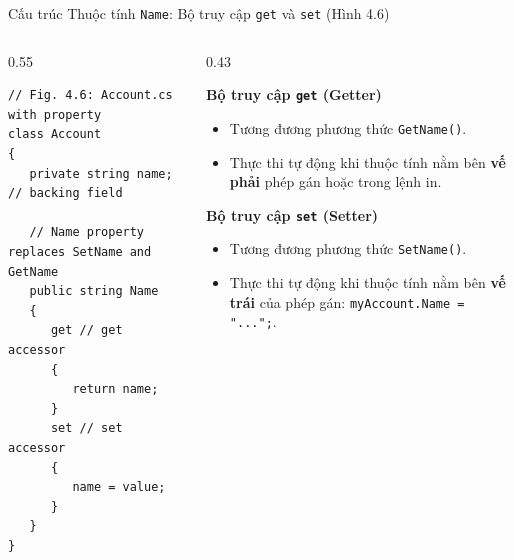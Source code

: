 \documentclass[aspectratio=169, 10pt]{beamer}
\begin{document}
\begin{frame}[fragile]{Cấu trúc Thuộc tính \texttt{Name}: Bộ truy cập \texttt{get} và \texttt{set} (Hình 4.6)}
  \begin{columns}[T]
    \begin{column}{0.55\textwidth}
      \begin{tcolorbox}[colback=CodeBg,colframe=UniNavy,title=\textbf{Account.cs with Property (Fig. 4.6)},fonttitle=\small\bfseries]
\begin{lstlisting}
// Fig. 4.6: Account.cs with property
class Account
{
   private string name; // backing field

   // Name property replaces SetName and GetName
   public string Name
   {
      get // get accessor
      {
         return name;
      }
      set // set accessor
      {
         name = value;
      }
   }
}
\end{lstlisting}
      \end{tcolorbox}
    \end{column}

    \begin{column}{0.43\textwidth}
      \begin{block}{\textbf{Bộ truy cập \texttt{get} (Getter)}}
        \begin{itemize}\small
          \item Tương đương phương thức \texttt{GetName()}.
          \item Thực thi tự động khi thuộc tính nằm bên \textbf{vế phải} phép gán hoặc trong lệnh in.
        \end{itemize}
      \end{block}
      \begin{exampleblock}{\textbf{Bộ truy cập \texttt{set} (Setter)}}
        \begin{itemize}\small
          \item Tương đương phương thức \texttt{SetName()}.
          \item Thực thi tự động khi thuộc tính nằm bên \textbf{vế trái} của phép gán: \texttt{myAccount.Name = "...";}.
        \end{itemize}
      \end{exampleblock}
    \end{column}
  \end{columns}
\end{frame}
\end{document}
